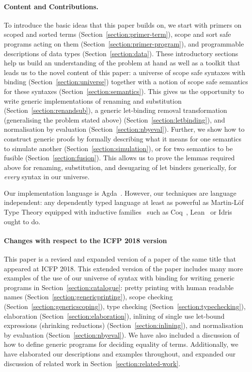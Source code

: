 \paragraph{Content and Contributions.}
To introduce the basic ideas that this paper builds on, we start with
primers on scoped and sorted terms
(Section~\ref{section:primer-term}), scope and sort safe programs
acting on them (Section~\ref{section:primer-program}), and
programmable descriptions of data types (Section~\ref{section:data}).
These introductory sections help us build an understanding of the
problem at hand as well as a toolkit that leads us to the novel
content of this paper: a universe of scope safe syntaxes with binding
(Section~\ref{section:universe}) together with a notion of scope safe
semantics for these syntaxes (Section~\ref{section:semantics}).  This
gives us the opportunity to write generic implementations of renaming
and substitution (Section~\ref{section:renandsub}), a generic
let-binding removal transformation (generalising the problem stated
above) (Section~\ref{section:letbinding}), and normalisation by
evaluation (Section~\ref{section:nbyeval}). Further, we show how to
construct generic proofs by formally describing what it means for one
semantics to simulate another (Section~\ref{section:simulation}), or
for two semantics to be fusible (Section~\ref{section:fusion}). This
allows us to prove the lemmas required above for renaming,
substitution, and desugaring of let binders generically, for
\emph{every} syntax in our universe.

\medskip

Our implementation language is
Agda~\cite{norell2009dependently}. However, our techniques are
language independent: any dependently typed language at least as
powerful as Martin-L\"of Type Theory\cite{martin1982constructive}
equipped with inductive families~\cite{dybjer1994inductive} such as
Coq~\cite{Coq:manual}, Lean~\cite{DBLP:conf/cade/MouraKADR15} or
Idris~\cite{brady2013idris} ought to do.

\medskip

\paragraph{Changes with respect to the ICFP 2018 version} This paper
is a revised and expanded version of a paper of the same title that
appeared at ICFP 2018. This extended version of the paper includes
many more examples of the use of our universe of syntax with binding
for writing generic programs in Section~\ref{section:catalogue}:
pretty printing with human readable names
(Section~\ref{section:genericprinting}), scope checking
(Section~\ref{section:genericscoping}), type checking
(Section~\ref{section:typechecking}), elaboration
(Section~\ref{section:elaboration}), inlining of single use let-bound
expressions (shrinking reductions) (Section~\ref{section:inlining}),
and normalisation by evaluation (Section~\ref{section:nbyeval}). We
have also included a discussion of how to define generic programs for
deciding equality of terms. Additionally, we have elaborated our
descriptions and examples throughout, and expanded our discussion of
related work in Section~\ref{section:related-work}.

